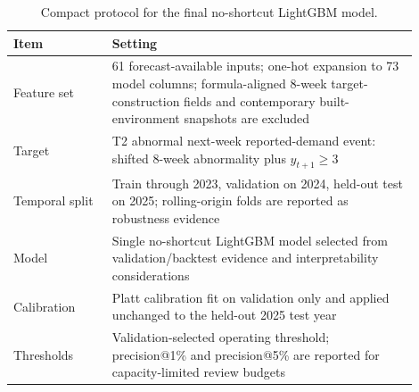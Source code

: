 \begin{table}[t]
\caption{Compact protocol for the final no-shortcut LightGBM model.}\label{tab:tuning_protocol}
\centering
\begin{tabular}{@{}p{0.22\linewidth}p{0.68\linewidth}@{}}
\toprule
Item & Setting \\
\midrule
Feature set & 61 forecast-available inputs; one-hot expansion to 73 model columns; formula-aligned 8-week target-construction fields and contemporary built-environment snapshots are excluded \\
Target & T2 abnormal next-week reported-demand event: shifted 8-week abnormality plus \(y_{t+1} \ge 3\) \\
Temporal split & Train through 2023, validation on 2024, held-out test on 2025; rolling-origin folds are reported as robustness evidence \\
Model & Single no-shortcut LightGBM model selected from validation/backtest evidence and interpretability considerations \\
Calibration & Platt calibration fit on validation only and applied unchanged to the held-out 2025 test year \\
Thresholds & Validation-selected operating threshold; precision@1\% and precision@5\% are reported for capacity-limited review budgets \\
\bottomrule
\end{tabular}
\end{table}
